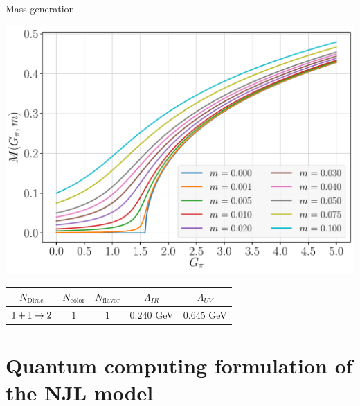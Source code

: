 \documentclass[9pt, handout, aspectratio=169]{beamer}	%
\begin{document}
\begin{frame}{Mass generation}

	\begin{center}
		\includegraphics[width=.5\paperwidth]{Figures/NJL1-model-solving/NJL1-dressed-mass-curves}
	\end{center}

	\vspace{-1em}

	\begin{table}[!bp]
	  \centering
	  \label{tab:NJL1-analytical-solution-parameters}
	  \begin{tabular}{ c c c c c }
	    \hline
	    $N_\text{Dirac}$ & $N_\text{color}$ & $N_\text{flavor}$ &
	    $\Lambda_{IR}$ & $\Lambda_{UV}$ \\
	    \hline
	    \hline
	    $1+1 \rightarrow 2$ & $1$ & $1$ & $0.240$ GeV & $0.645$ GeV \\
	    \hline
	  \end{tabular}
	\end{table}

\end{frame}


\section{Quantum computing formulation of the NJL model}
\end{document}
